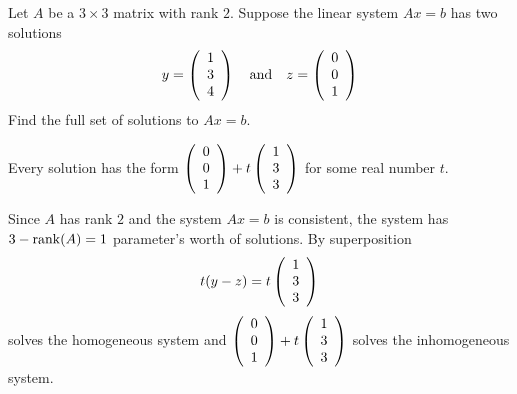 \documentclass{ximera}
\author{Marty Golubitsky}
\begin{document}
\begin{exercise}\label{A.3.4.2}

Let $A$ be a $3\times 3$ matrix with rank $2$.  Suppose the linear system $Ax=b$ has two solutions
\[
y = \left(\begin{array}{rrrrrrrrrrrrrrrrrr} 1 \\3 \\4 \end{array}\right) \quad\mbox{and}\quad z = \left(\begin{array}{rrrrrrrrrrrrrrrrrr} 0\\ 0 \\ 1 \end{array}\right)
\]
Find the full set of solutions to $Ax = b$. 
  
\begin{solution}

\ans Every solution has the form $\left(\begin{array}{rrrrrrrrrrrrrrrrrr} 0\\0\\1 \end{array}\right) + t \left(\begin{array}{rrrrrrrrrrrrrrrrrr} 1\\3\\3 \end{array}\right)$ for some real number $t$. 

\soln Since $A$ has rank $2$ and the system $Ax=b$ is consistent, the system has $3 -{\rm rank}(A) = 1$ parameter's worth of solutions.  By superposition 
\[
t(y - z) = t \left(\begin{array}{rrrrrrrrrrrrrrrrrr} 1\\3\\3 \end{array}\right)
\]
solves the homogeneous system and $\left(\begin{array}{rrrrrrrrrrrrrrrrrr} 0\\0\\1 \end{array}\right) + t \left(\begin{array}{rrrrrrrrrrrrrrrrrr} 1\\3\\3 \end{array}\right)$ solves the inhomogeneous system.

\end{solution}
\end{exercise}
\end{document}
